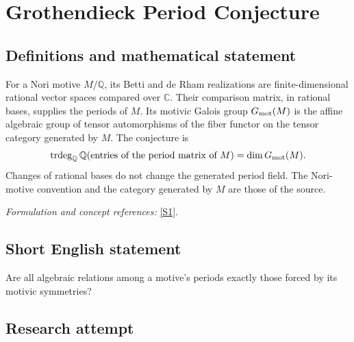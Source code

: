 \documentclass[11pt,a4paper]{article}
\newcommand{\Q}{\mathbb{Q}}
\newcommand{\C}{\mathbb{C}}
\newcommand{\sref}[2]{\hyperlink{source:#1:#2}{[S#2]}}
\newif\ifshowcatalogue
\newcommand{\cataloguescope}[1]{\ifshowcatalogue
 \paragraph{Exact scope in the supplied catalogue.}
 \begin{quote}\small #1\end{quote}\fi}
\numberwithin{equation}{section}
\begin{document}
\setcounter{section}{0}
\clearpage
\section*{\texorpdfstring{Grothendieck Period Conjecture}{Grothendieck Period Conjecture}}\label{statement}
\subsection{Definitions and mathematical statement}
For a Nori motive $M/\Q$, its Betti and de Rham realizations are finite-dimensional rational vector spaces compared over $\C$. Their comparison matrix, in rational bases, supplies the periods of $M$. Its motivic Galois group $G_{\rm mot}(M)$ is the affine algebraic group of tensor automorphisms of the fiber functor on the tensor category generated by $M$. The conjecture is
\[
 \operatorname{trdeg}_{\Q}\Q(\text{entries of the period matrix of }M)
 =\dim G_{\rm mot}(M).
\]
Changes of rational bases do not change the generated period field. The Nori-motive convention and the category generated by $M$ are those of the source.
\par\smallskip\textit{Formulation and concept references:} \sref{statement}{1}.
\cataloguescope{Prove that for every Nori motive M over Q, trdeg\_Q Q(periods of M) equals dim G\_mot(M), the dimension of its motivic Galois group.}
\subsection{Short English statement}
Are all algebraic relations among a motive's periods exactly those forced by its motivic symmetries?
\subsection{Research attempt}
\end{document}

